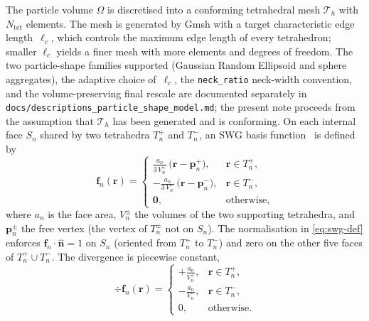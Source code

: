 \documentclass[11pt,a4paper]{article}
\begin{document}
The particle volume $\Omega$ is discretised into a conforming
tetrahedral mesh $\mathcal{T}_h$ with $N_{\text{tet}}$ elements.
The mesh is generated by Gmsh with a target characteristic edge
length~$\ell_c$, which controls the maximum edge length of every
tetrahedron; smaller $\ell_c$ yields a finer mesh with more elements
and degrees of freedom.
The two particle-shape families supported (Gaussian Random Ellipsoid
and sphere aggregates), the adaptive choice of~$\ell_c$, the
\texttt{neck\_ratio} neck-width convention, and the
volume-preserving final rescale are documented separately in
\texttt{docs/descriptions\_particle\_shape\_model.md}; the present
note proceeds from the assumption that $\mathcal{T}_h$ has been
generated and is conforming.
On each
internal face $S_n$ shared by two tetrahedra $T_n^{+}$ and $T_n^{-}$, an
SWG basis function~\cite[Eqs.~(10), (12)]{SWG1984} is defined by
\begin{equation}
  \bm{f}_n(\bm{r})
  =
  \begin{cases}
    \displaystyle\frac{a_n}{3\,V_n^{+}}\,\bigl(\bm{r} - \bm{p}_n^{+}\bigr),
      & \bm{r}\in T_n^{+},\\[6pt]
    -\displaystyle\frac{a_n}{3\,V_n^{-}}\,\bigl(\bm{r} - \bm{p}_n^{-}\bigr),
      & \bm{r}\in T_n^{-},\\[6pt]
    \bm{0}, & \text{otherwise},
  \end{cases}
  \label{eq:swg-def}
\end{equation}
where $a_n$ is the face area, $V_n^{\pm}$ the volumes of the two
supporting tetrahedra, and $\bm{p}_n^{\pm}$ the free vertex (the
vertex of $T_n^{\pm}$ not on $S_n$). The normalisation in
\eqref{eq:swg-def} enforces $\bm{f}_n\!\cdot\!\hat{\bm{n}} = 1$ on
$S_n$ (oriented from $T_n^{+}$ to $T_n^{-}$) and zero on the other
five faces of $T_n^{+} \cup T_n^{-}$. The divergence is piecewise
constant,
\begin{equation}
  \div\bm{f}_n(\bm{r})
  =
  \begin{cases}
    \displaystyle +\frac{a_n}{V_n^{+}}, & \bm{r}\in T_n^{+},\\[6pt]
    \displaystyle -\frac{a_n}{V_n^{-}}, & \bm{r}\in T_n^{-},\\[6pt]
    0, & \text{otherwise}.
  \end{cases}
  \label{eq:swg-div}
\end{equation}
\end{document}
